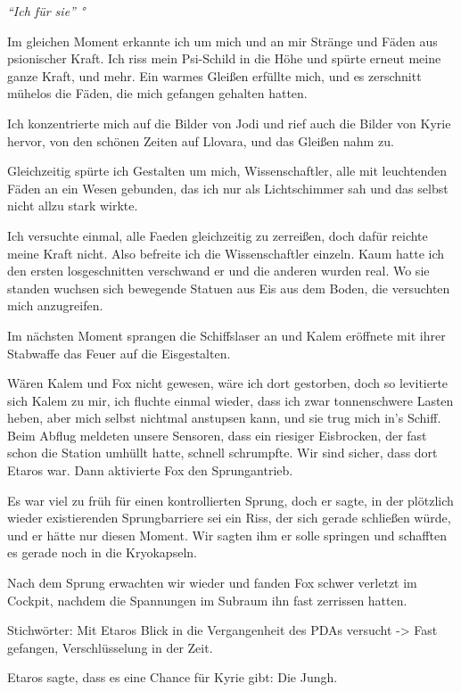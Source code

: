 \documentclass[11pt]{article}
\begin{document}
\emph{``Ich für sie'' °}

Im gleichen Moment erkannte ich um mich und an mir Stränge und Fäden aus
psionischer Kraft. Ich riss mein Psi-Schild in die Höhe und spürte
erneut meine ganze Kraft, und mehr. Ein warmes Gleißen erfüllte mich,
und es zerschnitt mühelos die Fäden, die mich gefangen gehalten hatten.

Ich konzentrierte mich auf die Bilder von Jodi und rief auch die Bilder
von Kyrie hervor, von den schönen Zeiten auf Llovara, und das Gleißen
nahm zu.

Gleichzeitig spürte ich Gestalten um mich, Wissenschaftler, alle mit
leuchtenden Fäden an ein Wesen gebunden, das ich nur als Lichtschimmer
sah und das selbst nicht allzu stark wirkte.

Ich versuchte einmal, alle Faeden gleichzeitig zu zerreißen, doch dafür
reichte meine Kraft nicht. Also befreite ich die Wissenschaftler
einzeln. Kaum hatte ich den ersten losgeschnitten verschwand er und die
anderen wurden real. Wo sie standen wuchsen sich bewegende Statuen aus
Eis aus dem Boden, die versuchten mich anzugreifen.

Im nächsten Moment sprangen die Schiffslaser an und Kalem eröffnete mit
ihrer Stabwaffe das Feuer auf die Eisgestalten.

Wären Kalem und Fox nicht gewesen, wäre ich dort gestorben, doch so
levitierte sich Kalem zu mir, ich fluchte einmal wieder, dass ich zwar
tonnenschwere Lasten heben, aber mich selbst nichtmal anstupsen kann,
und sie trug mich in's Schiff. Beim Abflug meldeten unsere Sensoren,
dass ein riesiger Eisbrocken, der fast schon die Station umhüllt hatte,
schnell schrumpfte. Wir sind sicher, dass dort Etaros war. Dann
aktivierte Fox den Sprungantrieb.

Es war viel zu früh für einen kontrollierten Sprung, doch er sagte, in
der plötzlich wieder existierenden Sprungbarriere sei ein Riss, der sich
gerade schließen würde, und er hätte nur diesen Moment. Wir sagten ihm
er solle springen und schafften es gerade noch in die Kryokapseln.

Nach dem Sprung erwachten wir wieder und fanden Fox schwer verletzt im
Cockpit, nachdem die Spannungen im Subraum ihn fast zerrissen hatten.

Stichwörter: Mit Etaros Blick in die Vergangenheit des PDAs versucht
-\textgreater{} Fast gefangen, Verschlüsselung in der Zeit.

Etaros sagte, dass es eine Chance für Kyrie gibt: Die Jungh.
\end{document}

